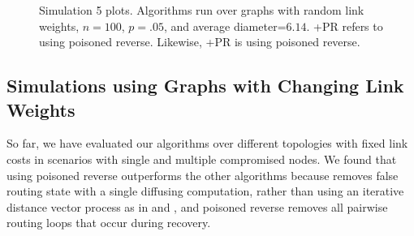 \begin{figure}
\centering
\caption{Simulation 5 plots.  Algorithms run over \er graphs with random link weights, $n=100$, $p=.05$, and average diameter=$6.14$. 
\seconds+{\textsc PR} refers to \second using poisoned reverse. Likewise, \cprs+{\textsc PR} is \cpr using poisoned reverse.}
\label{fig:pr-fix}
\end{figure}




\subsection{Simulations using Graphs with Changing Link Weights}
\label{subsec:change}

So far, we have evaluated our algorithms over different topologies with fixed link costs in scenarios with single and multiple compromised nodes.
We found that \cpr using poisoned reverse outperforms the other algorithms because \cpr removes false
routing state with a single diffusing computation, rather than using an iterative distance vector process as in \second and \purges, and poisoned reverse removes
all pairwise routing loops that occur during \cpr recovery. 

